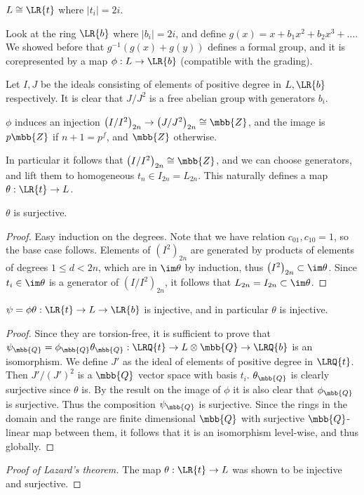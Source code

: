 \begin{theorem*}[Lazard]
	$L \cong \LR{t}$ where $\left|t_i\right| = 2i$.
\end{theorem*}

Look at the ring $\LR{b}$ where $\left|b_i\right| = 2i$,
and define $g\left(x\right) = x + b_1 x^2 + b_2 x^3 + \dotsc$.
We showed before that $g^{-1}\left(g\left(x\right) + g\left(y\right)\right)$ defines a formal group,
and it is corepresented by a map $\phi: L \to \LR{b}$ (compatible with the grading).

Let $I,J$ be the ideals consisting of elements of positive degree in $L,\LR{b}$ respectively.
It is clear that $J/J^2$ is a free abelian group with generators $b_i$.

\begin{lemma*}
	$\phi$ induces an injection
	$\left(I/I^2\right)_{2n} \to \left(J/J^2\right)_{2n} \cong \mbb{Z}$,
	and the image is $p\mbb{Z}$ if $n+1=p^f$, and $\mbb{Z}$ otherwise.
\end{lemma*}

In particular it follows that $\left(I/I^2\right)_{2n} \cong \mbb{Z}$,
and we can choose generators, and lift them to homogeneous $t_n \in I_{2n} = L_{2n}$.
This naturally defines a map $\theta: \LR{t} \to L$.

\begin{lemma*}
	$\theta$ is surjective.
\end{lemma*}

\begin{proof}
	Easy induction on the degrees.
	Note that we have relation $c_{01}, c_{10} = 1$, so the base case follows.
	Elements of $\left(I^2\right)_{2n}$ are generated by products of elements of degrees $1 \leq d < 2n$, which are in $\im \theta$ by induction, thus $\left(I^2\right)_{2n} \subset \im \theta$.
	Since $t_i \in \im \theta$ is a generator of $\left(I/I^2\right)_{2n}$, it follows that $L_{2n} = I_{2n} \subset \im \theta$.
\end{proof}

\begin{lemma*}
	$\psi = \phi\theta: \LR{t} \to L \to \LR{b}$ is injective, and in particular $\theta$ is injective.
\end{lemma*}

\begin{proof}
	Since they are torsion-free, it is sufficient to prove that
	$\psi_\mbb{Q} = \phi_\mbb{Q}\theta_\mbb{Q}: \LRQ{t} \to L\otimes\mbb{Q} \to \LRQ{b}$
	is an isomorphism.
	We define $J'$ as the ideal of elements of positive degree in $\LRQ{t}$.
	Then $J'/\left(J'\right)^2$ is a $\mbb{Q}$ vector space with basis $t_i$.
	$\theta_\mbb{Q}$ is clearly surjective since $\theta$ is.
	By the result on the image of $\phi$ it is also clear that $\phi_\mbb{Q}$ is surjective.
	Thus the composition $\psi_\mbb{Q}$ is surjective.
	Since the rings in the domain and the range are finite dimensional $\mbb{Q}$ with surjective $\mbb{Q}$-linear map between them, it follows that it is an isomorphism level-wise, and thus globally.
\end{proof}

\begin{proof}[Proof of Lazard's theorem]
	The map $\theta: \LR{t} \to L$ was shown to be injective and surjective.
\end{proof}
